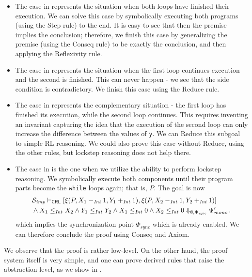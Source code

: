 \begin{itemize}
\item The case in  represents the situation when both loops have finished their execution.
We can solve this case by symbolically executing both programs (using the Step rule) to the end.
It is easy to see that then the premise implies the conclusion; therefore, we finish this case
by generalizing the premise (using the Conseq rule) to be exactly the conclusion, and then applying
the Reflexivity rule.
\item The case in  represents the situation when the first loop continues execution and the second is finished.
      This can never happen - we see that the side condition is contradictory.
      We finish this case using the Reduce rule.
\item The case in  represents the complementary situation - the first loop has finished its execution,
      while the second loop continues.
      This requires inventing an invariant capturing the idea that the execution of the second loop can only increase
      the difference between the values of \texttt{y}.
      We can Reduce this subgoal to simple RL reasoning. We could also prove this case without Reduce,
      using the other rules, but lockstep reasoning does not help there.
\item The case in  is the one when we utilize the ability to perform lockstep reasoning.
      We symbolically execute both components until their program parts become the \texttt{while} loops again;
      that is, $P$.
      The goal is now
      \begin{align*}
        & \mathcal{S}_{\mathit{imp}} \vdash_{\mathsf{CRL}}
        [ \xi(P, X_1 -_{\mathit{Int}} 1, Y_1 +_{\mathit{Int}} 1 ) ,  
          \xi(P, X_2 -_{\mathit{Int}} 1, Y_2 +_{\mathit{Int}} 1) ] \\
        & \land X_1 \leq_{\mathit{Int}} X_2 \land Y_1 \leq_{\mathit{Int}} Y_2 \land {X_1 \leq_{\mathit{Int}} 0 \land X_2 \leq_{\mathit{Int}} 0 }
        \Downarrow_{\emptyset, \Phi_{\mathit{sync}}} \Psi^\prime_{\mathit{mono}} \, .
      \end{align*}
      which implies the synchronization point $\Phi_{\mathit{sync}}$ which is already enabled.
      We can therefore conclude the proof using Conseq and Axiom.
\end{itemize}
We observe that the proof is rather low-level.
On the other hand, the proof system itself is very simple,
and one can prove derived rules that raise the abstraction level, as we show in .

